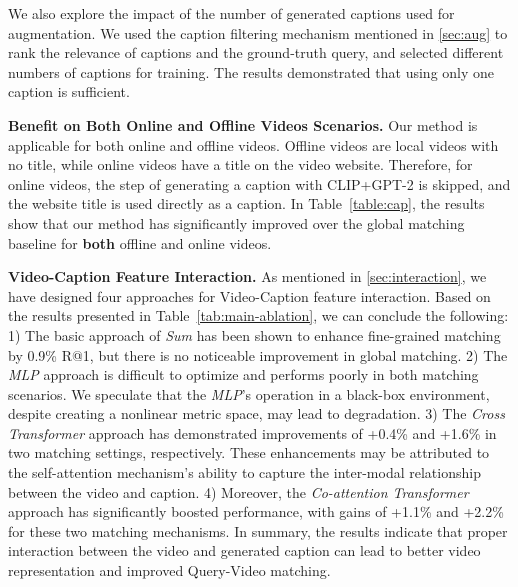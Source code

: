 \documentclass[10pt,twocolumn,letterpaper]{article}
\begin{document}
We also explore the impact of the number of generated captions used for augmentation. We used the caption filtering mechanism mentioned in \cref{sec:aug} to rank the relevance of captions and the ground-truth query, and selected different numbers of captions for training. The results demonstrated that using only one caption is sufficient.



\noindent\textbf{Benefit on Both Online and Offline Videos Scenarios.}
Our method is applicable for both online and offline videos. Offline videos are local videos with no title, while online videos have a title on the video website. Therefore, for online videos, the step of generating a caption with CLIP+GPT-2 is skipped, and the website title is used directly as a caption. In Table~\ref{table:cap}, the results show that our method has significantly improved over the global matching baseline for \textbf{both} offline and online videos.

\noindent\textbf{Video-Caption Feature Interaction.}
As mentioned in \cref{sec:interaction}, we have designed four approaches for Video-Caption feature interaction. Based on the results presented in Table~\ref{tab:main-ablation}, we can conclude the following:
1) The basic approach of \emph{Sum} has been shown to enhance fine-grained matching by 0.9\% R@1, but there is no noticeable improvement in global matching.
2) The \emph{MLP} approach is difficult to optimize and performs poorly in both matching scenarios. We speculate that the \emph{MLP}'s operation in a black-box environment, despite creating a nonlinear metric space, may lead to degradation.
3) The \emph{Cross Transformer} approach has demonstrated improvements of +0.4\% and +1.6\% in two matching settings, respectively. These enhancements may be attributed to the self-attention mechanism's ability to capture the inter-modal relationship between the video and caption.
4) Moreover, the \emph{Co-attention Transformer} approach has significantly boosted performance, with gains of +1.1\% and +2.2\% for these two matching mechanisms.
In summary, the results indicate that proper interaction between the video and generated caption can lead to better video representation and improved Query-Video matching.

\begin{table}[t]
\centering
{}
\vspace{-1mm}
\caption{Exploring the effectiveness of captions from different sources on MSR-VTT 1k-A. Setting: ViT-B/32, global matching.}
\label{table:cap}
\end{table}
\end{document}
